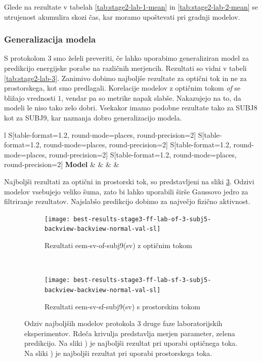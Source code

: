 Glede na rezultate v tabelah \ref{tab:stage2-lab-1-mean} in  \ref{tab:stage2-lab-2-mean} se utrujenost akumulira skozi čas, kar moramo upoštevati pri gradnji modelov.


\subsubsection{Generalizacija modela}
S protokolom 3 smo želeli preveriti, če lahko uporabimo generaliziran model za predikcijo energijske porabe na različnih merjencih. Rezultati so vidni v tabeli \ref{tab:stage2-lab-3}. Zanimivo dobimo najboljše rezultate za optični tok in ne za prostorskega, kot smo predlagali. Korelacije modelov z optičnim tokom \textit{of} se bližajo vrednosti $1$, vendar pa so metrike napak slabše. Nakazujejo na to, da modeli le niso tako zelo dobri. Vsekakor imamo podobne rezultate tako za SUBJ8 kot za SUBJ9, kar naznanja dobro generalizacijo modela.

\begin{table}[!htbp]
	\centering
	\begin{tabular}{l S[table-format=1.2, round-mode=places, round-precision=2] S[table-format=1.2, round-mode=places, round-precision=2] S[table-format=1.2, round-mode=places, round-precision=2] S[table-format=1.2, round-mode=places, round-precision=2]}
		\toprule
		\textbf{Model} &  &  &  &  \\
		\midrule
		\bottomrule
	\end{tabular}
	\caption[Validacijske metrike za protokol 3 2. faze lab. eksperimentov]{Validacijske metrike za protokol 3 druge faze laboratorijskih eksperimentov.}
	\label{tab:stage2-lab-3}
\end{table}

Najboljši rezultati za optični in prostorski tok, so predstavljeni na sliki \ref{fig:lab-3}. Odzivi modelov vsebujejo veliko šuma, zato bi lahko uporabili širše Gaussovo jedro za filtriranje rezultatov. Najslabšo predikcijo dobimo za največjo fizično aktivnost.

\begin{figure}[!htbp]
	\centering
	\begin{subfigure}[t]{0.45\columnwidth}
		\texttt{[image: best-results-stage3-ff-lab-of-3-subj5-backview-backview-normal-val-sl]}
		\caption{Rezultati eem-sv-of-subj9(sv) z optičnim tokom}
		\label{fig:lab-of-3}
	\end{subfigure}
	~
	\begin{subfigure}[t]{0.45\columnwidth}
		\texttt{[image: best-results-stage3-ff-lab-sf-3-subj5-backview-backview-normal-val-sl]}
		\caption{Rezultati eem-sv-sf-subj9(sv) s prostorskim tokom}
		\label{fig:lab-sf-3}
	\end{subfigure}
	\caption[Odziv SUBJ9 modelov protokola 3 druge faze laboratorijskih eksperimentov]{Odziv najboljših modelov protokola 3 druge faze laboratorijskih eksperimentov. Rdeča krivulja predstavlja merjen parameter, zelena predikcijo. Na sliki ) je najboljši rezultat pri uporabi optičnega toka. Na sliki ) je najboljši rezultat pri uporabi prostorskega toka.}
	\label{fig:lab-3}
\end{figure}

